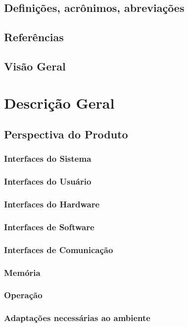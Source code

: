 \documentclass[a4paper,10pt]{book}
\begin{document}
\section{Definições, acrônimos, abreviações}
\section{Referências}
\section{Visão Geral}

\chapter{Descrição Geral}

\section{Perspectiva do Produto}
    \subsection{Interfaces do Sistema}
    \subsection{Interfaces do Usuário}
    \subsection{Interfaces do Hardware}
    \subsection{Interfaces de Software}
    \subsection{Interfaces de Comunicação}
    \subsection{Memória}
    \subsection{Operação}
    \subsection{Adaptações necessárias ao ambiente  }
\end{document}

